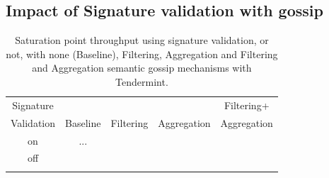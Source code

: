 





\subsection{Impact of Signature validation with gossip}
\label{sec:signatureImpact}


\begin{table}[h!]
	\begin{tabular}{c c c c c }
	\hline
     Signature     &        &       &       & Filtering+  \\ 
	 Validation & Baseline   & Filtering    & Aggregation    & Aggregation  \\  \hline
	  on  		& 		...		&		&		&   \\
	  off  		& 				&		&		&    \\ \hline \\
	\end{tabular}
	\caption{Saturation point throughput using signature validation, or not, with 
	none (Baseline), Filtering,
	Aggregation and Filtering and Aggregation semantic gossip mechanisms with Tendermint.}
\end{table}




